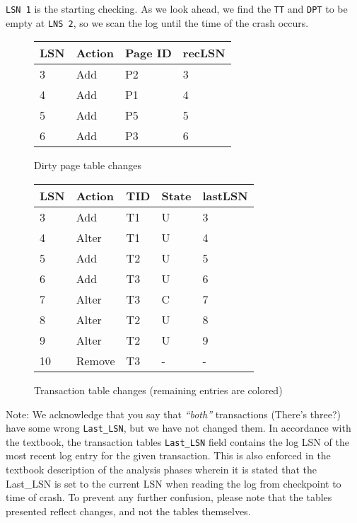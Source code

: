 \begin{multicols}{2}

{\tt LSN 1} is the starting checking. As we look ahead, we find the {\tt TT} and
{\tt DPT} to be empty at {\tt LNS 2}, so we scan the log until the time of the
crash occurs.

\begin{figure}[H]
    \centering
    \begin{tabular}{|l|l|l|l|}
        \hline
        {\bf LSN} & {\bf Action} & {\bf Page ID} & {\bf recLSN} \\ \hline
        3 & Add     & P2 & 3  \\ \hline
        4 & Add     & P1 & 4  \\ \hline
        5 & Add     & P5 & 5  \\ \hline
        6 & Add     & P3 & 6  \\ \hline
    \end{tabular}
    \caption{Dirty page table changes}
    \label{fig:dpt}
\end{figure}

\colbreak

\begin{figure}[H]
    \centering
    \begin{tabular}{|l|l|l|l|l|}
        \hline
        {\bf LSN} & {\bf Action}   & {\bf TID}  & {\bf State}  & {\bf lastLSN} \\ \hline
        3  & Add     & T1 & U & 3 \\ \hline %
        \rowcolor{awesomecolor}
        4  & Alter   & T1 & U & 4 \\ \hline %
        5  & Add     & T2 & U & 5 \\ \hline
        6  & Add     & T3 & U & 6 \\ \hline
        7  & Alter   & T3 & C & 7 \\ \hline
        8  & Alter   & T2 & U & 8 \\ \hline
        \rowcolor{awesomecolor}
        9  & Alter   & T2 & U & 9 \\ \hline
        10 & Remove  & T3 & - & - \\ \hline
    \end{tabular}
    \caption{Transaction table changes (remaining entries are colored)}
    \label{fig:tt}
\end{figure}

\end{multicols}

Note: We acknowledge that you say that {\it ``both''} transactions (There's three?) have some wrong {\tt Last\_LSN}, but we have not changed them. In accordance with the textbook, the transaction tables {\tt Last\_LSN} field contains the log LSN of the most recent log entry for the given transaction. This is also enforced in the textbook description of the analysis phases wherein it is stated that the {Last\_LSN} is set to the current LSN when reading the log from checkpoint to time of crash. To prevent
any further confusion, please note that the tables presented reflect changes, and not
the tables themselves.\\

